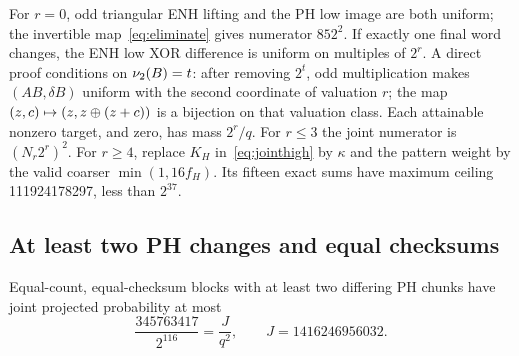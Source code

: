 For $r=0$, odd triangular ENH lifting and the PH low image are both uniform; the invertible map~\eqref{eq:eliminate} gives numerator $852^2$.
If exactly one final word changes, the ENH low XOR difference is uniform on multiples of $2^r$. A direct proof conditions on $\nu_2(B)=t$: after removing $2^t$, odd multiplication makes $(AB,\delta B)$ uniform with the second coordinate of valuation $r$; the map $(z,c)\mapsto(z,z\mathbin\oplus(z+c))$ is a bijection on that valuation class. Each attainable nonzero target, and zero, has mass $2^r/q$. For $r\le3$ the joint numerator is $(N_r2^r)^2$. For $r\ge4$, replace $K_H$ in~\eqref{eq:jointhigh} by $\kappa$ and the pattern weight by the valid coarser $\min(1,16f_H)$. Its fifteen exact sums have maximum ceiling 111924178297, less than $2^{37}$\cite{enhprior}.

\subsection{At least two PH changes and equal checksums}
\begin{lemma}\label{lem:twoph}
Equal-count, equal-checksum blocks with at least two differing PH chunks have joint projected probability at most
\[
 \frac{345763417}{2^{116}}=\frac{J}{q^2},\qquad J=1416246956032.
\]
\end{lemma}
